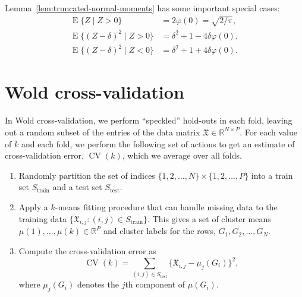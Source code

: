 \documentclass[12pt]{article}
\newcommand{\CV}{\operatorname{CV}}
\newcommand{\E}{\operatorname{E}}
\newcommand{\R}{\mathbb{R}}
\newcommand{\dataX}{\mathfrak{X}}
\begin{document}
Lemma~\ref{lem:truncated-normal-moments} has some important special cases:
\begin{align*}
  \E\{Z \mid Z > 0\} &= 2 \varphi(0) = \sqrt{2 / \pi}, \\
  \E\{(Z - \delta)^2 \mid Z > 0 \}
    &= \delta^2 + 1 - 4 \delta \varphi(0), \\
  \E\{(Z - \delta)^2 \mid Z < 0 \}
    &= \delta^2 + 1 + 4 \delta \varphi(0).
\end{align*}


\section{Wold cross-validation}
\label{sec:wold-cv}

In Wold cross-validation, we perform ``speckled'' hold-outs in each fold, leaving out a
random subset of the entries of the data matrix $\dataX \in \R^{N \times P}$. For each value
of $k$ and each fold, we perform the following set of actions to get an
estimate of cross-validation error, $\CV(k)$, which we average over all folds.

\begin{enumerate}
  \item Randomly partition the set of indices $\{ 1, 2, \dotsc, N \} \times \{
    1, 2, \dotsc, P \}$ into a train set $S_\text{train}$ and a test set
    $S_\text{test}$.

  \item Apply a $k$-means fitting procedure that can handle missing data to
    the training data $\{ \dataX_{i,j} : (i,j) \in S_{\text{train}} \}$. This
    gives a set of cluster means $\mu(1), \dotsc, \mu(k) \in \R^P$ and
    cluster labels for the rows, $G_1, G_2, \dotsc, G_N$.

  \item Compute the cross-validation error as
    \[
      \CV(k) = \sum_{(i,j) \in S_{\text{test}}} \{ \dataX_{i,j} - \mu_j(G_i) \}^2,
    \]
    where $\mu_j(G_i)$ denotes the $j$th component of $\mu(G_i)$.
\end{enumerate}
\end{document}

